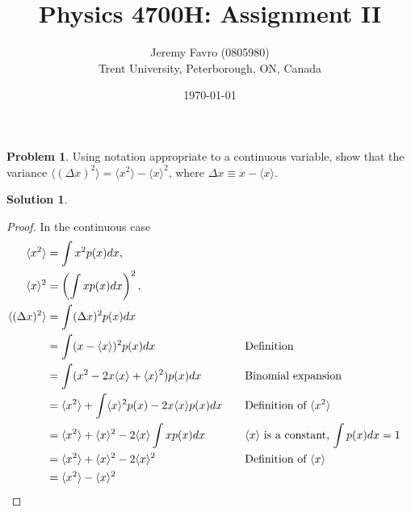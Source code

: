 \documentclass[10pt]{article}
\title{Physics 4700H: Assignment II}
\author{Jeremy Favro (0805980) \\ Trent University, Peterborough, ON, Canada}
\date{\today}
\theoremstyle{definition}
\newtheorem{problem}{Problem}
\newtheorem{soln}{Solution}
\newcommand{\justif}[2]{&{#1}&\text{#2}}
\begin{document}
\maketitle

\begin{problem} Using notation appropriate to a continuous variable, show that the variance $\langle(\Delta x)^2\rangle=\langle x^2\rangle-\langle x\rangle^2$,
where $\Delta x \equiv x-\langle x\rangle$.
\end{problem}
\begin{soln}
  \begin{proof}
    In the continuous case
    \begin{align*}
      \langle x^2\rangle         & =\int x^2p(x)dx,                                                                                                                         \\
      \langle x\rangle^2         & =\left(\int xp(x)dx\right)^2,                                                                                                            \\
      \langle(\Delta x)^2\rangle & =\int (\Delta x)^2p(x)dx                                                                                                                 \\
                                 & =\int(x-\langle x\rangle)^2p(x)dx \justif{\quad}{Definition}                                                                             \\
                                 & =\int(x^2-2x\langle x\rangle+\langle x\rangle^2)p(x)dx \justif{\quad}{Binomial expansion}                                                \\
                                 & =\langle x^2\rangle+\int \langle x\rangle^2 p(x)-2x\langle x\rangle p(x)dx \justif{\quad}{Definition of $\langle x^2\rangle$}            \\
                                 & =\langle x^2\rangle+\langle x\rangle^2 -2\langle x\rangle\int x p(x)dx \justif{\quad}{$\langle x\rangle$ is a constant, $\int p(x)dx=1$} \\
                                 & =\langle x^2\rangle+\langle x\rangle^2 -2\langle x\rangle^2 \justif{\quad}{Definition of $\langle x\rangle$}                             \\
                                 & =\langle x^2\rangle-\langle x\rangle^2\qedhere
    \end{align*}
  \end{proof}
\end{soln}
\end{document}
